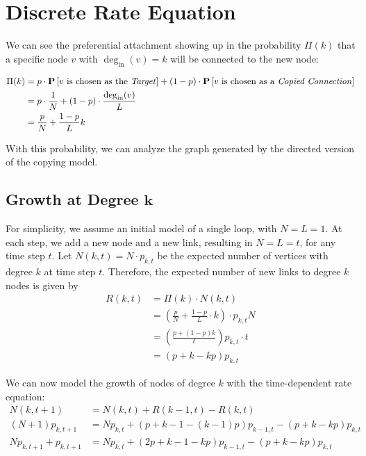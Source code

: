 \section{Discrete Rate Equation}

We can see the preferential attachment showing up in the probability $\Pi(k)$ that a specific node $v$ with $\deg_\text{in}(v) = k$ will be connected to the new node:

\begin{align*}
    \Pi(k) &= p \cdot \mathbf{P}\left[\text{$v$ is chosen as the \textit{Target}}\right] + (1-p) \cdot \mathbf{P}\left[\text{$v$ is chosen as a \textit{Copied Connection}}\right] \\
    &= p \cdot \frac{1}{N} + (1-p) \cdot \frac{\deg_\text{in}(v)}{L} \\
    &= \frac{p}{N} + \frac{1-p}{L} k
\end{align*}

With this probability, we can analyze the graph generated by the directed version of the copying model.

\subsection{Growth at Degree \texorpdfstring{$\bm{k}$}{k}}

    For simplicity, we assume an initial model of a single loop, with $N = L = 1$. At each step, we add a new node and a new link, resulting in $N = L = t$, for any time step $t$. Let $N(k,t) = N \cdot p_{k,t}$ be the expected number of vertices with degree $k$ at time step $t$. Therefore, the expected number of new links to degree $k$ nodes is given by
    \begin{align*}
        R(k,t) &= \Pi(k) \cdot N(k,t) \\
            &= \left(\frac{p}{N} + \frac{1-p}{L} \cdot k\right) \cdot p_{k,t} N \\
            &= \left(\frac{p + \left(1 - p\right) k}{t}\right) p_{k,t} \cdot t \\
            &= \left(p + k - k p\right) p_{k,t}
    \end{align*}

    We can now model the growth of nodes of degree $k$ with the time-dependent rate equation:
    \begin{align*}
        N(k,t+1) &= N(k,t) + R(k-1,t) - R(k,t) \\
        (N + 1) p_{k,t+1} &= N p_{k,t} + (p + k-1 - (k-1) p) p_{k-1,t} - (p + k - k p) p_{k,t} \\
        N p_{k,t+1} + p_{k,t+1} &= N p_{k,t} + (2p + k - 1 - k p) p_{k-1,t} - (p + k - k p) p_{k,t}
    \end{align*}

